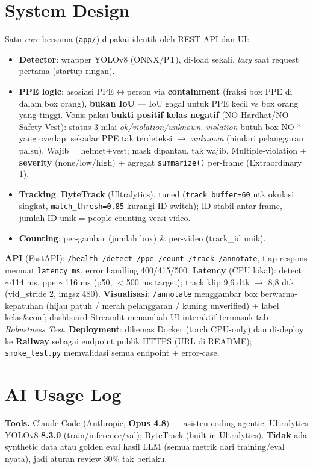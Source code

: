 \documentclass[10pt,a4paper]{article}
\newcommand{\code}[1]{\texttt{\small #1}}
\begin{document}
\section{System Design}
Satu \textit{core} bersama (\code{app/}) dipakai identik oleh REST API dan UI:
\begin{itemize}
\item \textbf{Detector}: wrapper YOLOv8 (ONNX/PT), di-load sekali, \textit{lazy} saat request pertama (startup ringan).
\item \textbf{PPE logic}: asosiasi PPE$\leftrightarrow$person via \textbf{containment} (fraksi box PPE di dalam box orang), \textbf{bukan IoU} --- IoU gagal untuk PPE kecil vs box orang yang tinggi. Vonis pakai \textbf{bukti positif kelas negatif} (NO-Hardhat/NO-Safety-Vest): status 3-nilai \textit{ok/violation/unknown}. \textit{violation} butuh box NO-* yang overlap; sekadar PPE tak terdeteksi $\rightarrow$ \textit{unknown} (hindari pelanggaran palsu). Wajib = helmet+vest; mask dipantau, tak wajib. Multiple-violation + \textbf{severity} (none/low/high) + agregat \code{summarize()} per-frame (Extraordinary 1).
\item \textbf{Tracking}: \textbf{ByteTrack} (Ultralytics), tuned (\code{track\_buffer=60} utk okulasi singkat, \code{match\_thresh=0.85} kurangi ID-switch); ID stabil antar-frame, jumlah ID unik = people counting versi video.
\item \textbf{Counting}: per-gambar (jumlah box) \& per-video (track\_id unik).
\end{itemize}
\textbf{API} (FastAPI): \code{/health /detect /ppe /count /track /annotate}, tiap respons memuat \code{latency\_ms}, error handling 400/415/500. \textbf{Latency} (CPU lokal): detect $\sim$114 ms, ppe $\sim$116 ms (p50, $<$500 ms target); track klip 9,6 dtk $\rightarrow$ 8,8 dtk (vid\_stride 2, imgsz 480). \textbf{Visualisasi}: \code{/annotate} menggambar box berwarna-kepatuhan (hijau patuh / merah pelanggaran / kuning unverified) + label kelas\&conf; dashboard Streamlit menambah UI interaktif termasuk tab \textit{Robustness Test}. \textbf{Deployment}: dikemas Docker (torch CPU-only) dan di-deploy ke \textbf{Railway} sebagai endpoint publik HTTPS (URL di README); \code{smoke\_test.py} memvalidasi semua endpoint + error-case.

\section{AI Usage Log}
\textbf{Tools.} Claude Code (Anthropic, \textbf{Opus 4.8}) --- asisten coding agentic; Ultralytics YOLOv8 \textbf{8.3.0} (train/inference/val); ByteTrack (built-in Ultralytics). \textbf{Tidak} ada synthetic data atau golden eval hasil LLM (semua metrik dari training/eval nyata), jadi aturan review 30\% tak berlaku.
\end{document}
